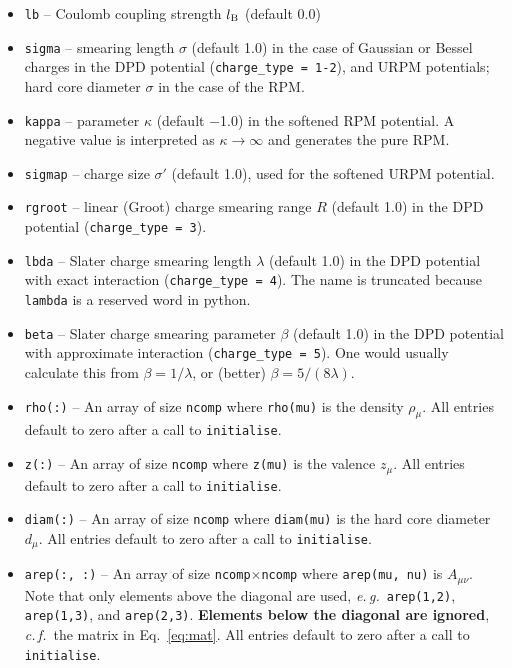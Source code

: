 \documentclass[12pt,a4paper]{article}
\newcommand{\latin}[1]{\emph{#1}}
\newcommand{\eg}{\latin{e.\,g.}}
\newcommand{\cf}{\latin{c.\,f.}}
\newcommand{\Eqref}[1]{Eq.~\eqref{#1}}
\begin{document}
\begin{itemize}
%
\item\verb+lb+ -- Coulomb coupling strength $l_{\mathrm{B}}$ (default 0.0)
%
\item\verb+sigma+ -- smearing length $\sigma$ (default 1.0) in the
  case of Gaussian or Bessel charges in the DPD potential
  (\verb+charge_type = 1-2+), and URPM potentials; hard core diameter
  $\sigma$ in the case of the RPM.
%
\item\verb+kappa+ -- parameter $\kappa$ (default $-$1.0) in the
  softened RPM potential.  A negative value is interpreted as
  $\kappa\to\infty$ and generates the pure RPM.
%
\item\verb+sigmap+ -- charge size $\sigma'$ (default 1.0), used for
  the softened URPM potential.
%
\item\verb+rgroot+ -- linear (Groot) charge smearing range $R$
  (default 1.0) in the DPD potential (\verb+charge_type = 3+).
%
\item\verb+lbda+ -- Slater charge smearing length $\lambda$ (default
  1.0) in the DPD potential with exact interaction
  (\verb+charge_type = 4+).  The name is truncated because
  \verb+lambda+ is a reserved word in python.
%
\item\verb+beta+ -- Slater charge smearing parameter $\beta$
  (default 1.0) in the DPD potential with approximate interaction
  (\verb+charge_type = 5+).  One would usually calculate this from
  $\beta=1/\lambda$, or (better) $\beta=5/(8\lambda)$.
%
\item\verb+rho(:)+ -- An array of size \verb+ncomp+ where
  \verb+rho(mu)+ is the density $\rho_\mu$.  All entries default to
  zero after a call to \verb+initialise+.
%
\item\verb+z(:)+ -- An array of size \verb+ncomp+ where
  \verb+z(mu)+ is the valence $z_\mu$.  All entries default to
  zero after a call to \verb+initialise+.
%
\item\verb+diam(:)+ -- An array of size \verb+ncomp+ where
  \verb+diam(mu)+ is the hard core diameter $d_\mu$.  All entries
  default to zero after a call to \verb+initialise+.
%
\item\verb+arep(:, :)+ -- An array of size
  \verb+ncomp+$\times$\verb+ncomp+ where \verb+arep(mu, nu)+ is
  $A_{\mu\nu}$.  Note that only elements above the diagonal are used,
  \eg\ \verb+arep(1,2)+, \verb+arep(1,3)+, and \verb+arep(2,3)+.  {\bf
    Elements below the diagonal are ignored}, \cf\ the matrix in
  \Eqref{eq:mat}.  All entries default to zero after a call to
    \verb+initialise+.
%
\end{itemize}
\end{document}
